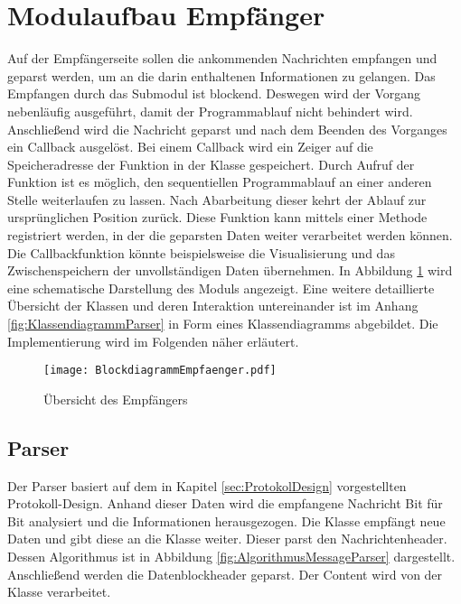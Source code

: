 \section{Modulaufbau Empf{\"a}nger}

Auf der Empf{\"a}ngerseite sollen die ankommenden Nachrichten empfangen und geparst
werden, um an die darin enthaltenen Informationen zu gelangen. Das Empfangen
durch das Submodul  ist blockend. Deswegen wird der Vorgang
nebenl{\"a}ufig ausgef{\"u}hrt, damit der Programmablauf nicht behindert wird.
Anschließend wird die Nachricht geparst und nach dem Beenden des Vorganges ein Callback
ausgel{\"o}st. Bei einem Callback wird ein Zeiger auf die Speicheradresse der
Funktion in der Klasse gespeichert. Durch Aufruf der Funktion ist es
m{\"o}glich, den sequentiellen Programmablauf an einer anderen Stelle
weiterlaufen zu lassen. Nach Abarbeitung dieser kehrt der Ablauf zur
urspr{\"u}nglichen Position zur{\"u}ck. Diese Funktion kann mittels einer
Methode registriert werden, in der die geparsten Daten weiter verarbeitet werden
k{\"o}nnen.
Die Callbackfunktion k{\"o}nnte beispielsweise die Visualisierung und das
Zwischenspeichern der unvollständigen Daten {\"u}bernehmen. \newline 
In Abbildung \ref{fig:BlockdiagrammEmpfaenger} wird eine schematische
Darstellung des Moduls angezeigt. Eine weitere detaillierte Übersicht der Klassen
und deren Interaktion untereinander ist im Anhang
\ref{fig:KlassendiagrammParser} in Form eines Klassendiagramms 
abgebildet.
Die Implementierung wird im Folgenden n{\"a}her erl{\"a}utert.

\begin{figure}[H]
	\centering
	\texttt{[image: BlockdiagrammEmpfaenger.pdf]}
	\caption{{\"U}bersicht des Empf{\"a}ngers}
	\label{fig:BlockdiagrammEmpfaenger}
\end{figure}

\subsection{Parser}

Der Parser basiert auf dem in Kapitel \ref{sec:ProtokolDesign}
vorgestellten Protokoll-Design.
Anhand dieser Daten wird die empfangene Nachricht Bit f{\"u}r Bit analysiert
und die Informationen herausgezogen. 
Die Klasse  empf{\"a}ngt neue Daten und gibt diese an
die Klasse  weiter. Dieser parst den Nachrichtenheader.
Dessen Algorithmus ist in Abbildung \ref{fig:AlgorithmusMessageParser}
dargestellt.
Anschlie{\ss}end werden die Datenblockheader geparst. Der Content wird von der
Klasse  verarbeitet.

